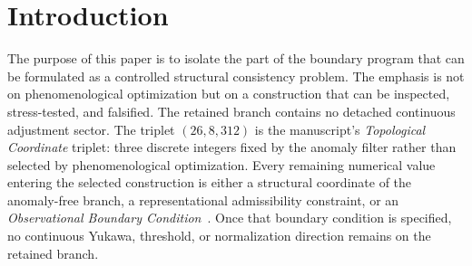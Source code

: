 \documentclass[11pt]{article}
\begin{document}
\section{Introduction}

The purpose of this paper is to isolate the part of the boundary program that can be formulated as a controlled structural consistency problem. The emphasis is not on phenomenological optimization but on a construction that can be inspected, stress-tested, and falsified. The retained branch contains no detached continuous adjustment sector. The triplet $(26,8,312)$ is the manuscript's \emph{Topological Coordinate} triplet: three discrete integers fixed by the anomaly filter rather than selected by phenomenological optimization. Every remaining numerical value entering the selected construction is either a structural coordinate of the anomaly-free branch, a representational admissibility constraint, or an \emph{Observational Boundary Condition}~\cite{friedan1987,witten1989}. Once that boundary condition is specified, no continuous Yukawa, threshold, or normalization direction remains on the retained branch.
\end{document}
